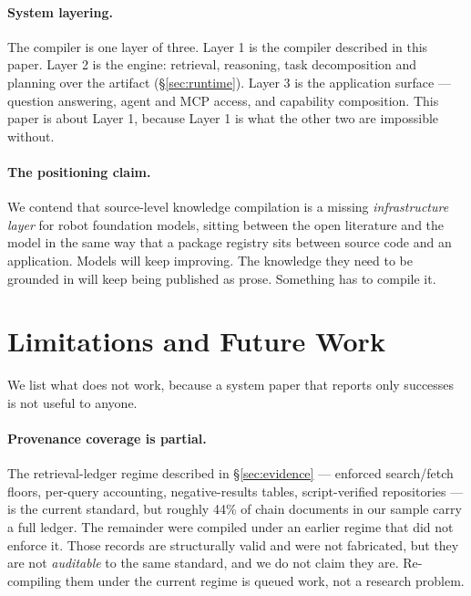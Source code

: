 \documentclass[10pt,a4paper]{article}
\begin{document}
\paragraph{System layering.} The compiler is one layer of three. Layer 1 is the
compiler described in this paper. Layer 2 is the engine: retrieval, reasoning,
task decomposition and planning over the artifact (\S\ref{sec:runtime}). Layer 3
is the application surface --- question answering, agent and MCP access, and
capability composition. This paper is about Layer 1, because Layer 1 is what the
other two are impossible without.

\paragraph{The positioning claim.} We contend that source-level knowledge
compilation is a missing \emph{infrastructure layer} for robot foundation models,
sitting between the open literature and the model in the same way that a package
registry sits between source code and an application. Models will keep improving.
The knowledge they need to be grounded in will keep being published as prose.
Something has to compile it.

\section{Limitations and Future Work}
\label{sec:limits}

We list what does not work, because a system paper that reports only successes is
not useful to anyone.

\paragraph{Provenance coverage is partial.} The retrieval-ledger regime described
in \S\ref{sec:evidence} --- enforced search/fetch floors, per-query accounting,
negative-results tables, script-verified repositories --- is the current standard,
but roughly 44\% of chain documents in our sample carry a full ledger. The
remainder were compiled under an earlier regime that did not enforce it. Those
records are structurally valid and were not fabricated, but they are not
\emph{auditable} to the same standard, and we do not claim they are. Re-compiling
them under the current regime is queued work, not a research problem.
\end{document}
